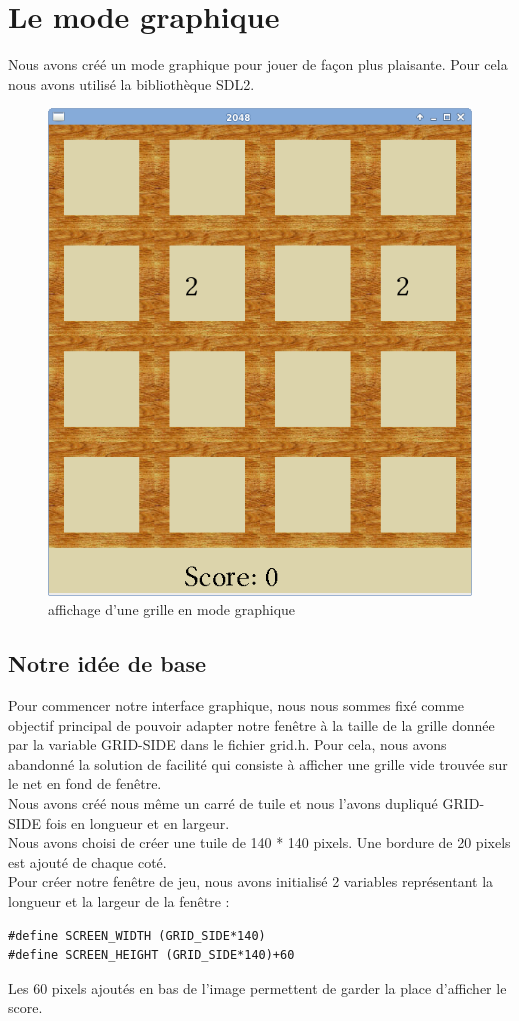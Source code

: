 \documentclass{report}
\begin{document}
\chapter{Le mode graphique}
Nous avons créé un mode graphique pour jouer de façon plus plaisante. Pour cela nous avons utilisé la bibliothèque SDL2.
\begin{figure}[hbtp]
\caption{affichage d'une grille en mode graphique}
\centering
\includegraphics[scale=0.3]{modegraphique.png}
\end{figure}
\section{Notre idée de base}
Pour commencer notre interface graphique, nous nous sommes fixé comme objectif principal de pouvoir adapter notre fenêtre à la taille de la grille donnée par la variable GRID-SIDE dans le fichier grid.h. Pour cela, nous avons abandonné la solution de facilité qui consiste à afficher une grille vide trouvée sur le net en fond de fenêtre.\\
Nous avons créé nous même un carré de tuile et nous l'avons dupliqué GRID-SIDE fois en longueur et en largeur.\\
Nous avons choisi de créer une tuile de 140 * 140 pixels. Une bordure de 20 pixels est ajouté de chaque coté.\\
Pour créer notre fenêtre de jeu, nous avons initialisé 2 variables représentant la longueur et la largeur de la fenêtre :
\begin{lstlisting}[frame=single]
#define SCREEN_WIDTH (GRID_SIDE*140)
#define SCREEN_HEIGHT (GRID_SIDE*140)+60
\end{lstlisting}
Les 60 pixels ajoutés en bas de l'image permettent de garder la place d'afficher le score.\\
\end{document}
